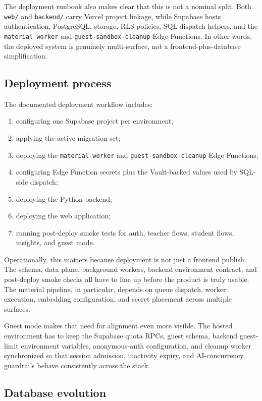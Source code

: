 \documentclass[11pt,a4paper]{article}
\begin{document}
The deployment runbook also makes clear that this is not a nominal split. Both \texttt{web/} and
\texttt{backend/} carry Vercel project linkage, while Supabase hosts authentication, PostgreSQL,
storage, RLS policies, SQL dispatch helpers, and the \texttt{material-worker} and
\texttt{guest-sandbox-cleanup} Edge Functions. In other words, the deployed system is genuinely
multi-surface, not a frontend-plus-database simplification.

\subsection{Deployment process}

The documented deployment workflow includes:
\begin{enumerate}
  \item configuring one Supabase project per environment;
  \item applying the active migration set;
  \item deploying the \texttt{material-worker} and \texttt{guest-sandbox-cleanup} Edge Functions;
  \item configuring Edge Function secrets plus the Vault-backed values used by SQL-side dispatch;
  \item deploying the Python backend;
  \item deploying the web application;
  \item running post-deploy smoke tests for auth, teacher flows, student flows, insights, and guest mode.
\end{enumerate}

Operationally, this matters because deployment is not just a frontend publish. The schema, data
plane, background workers, backend environment contract, and post-deploy smoke checks all have to
line up before the product is truly usable. The material pipeline, in particular, depends on queue
dispatch, worker execution, embedding configuration, and secret placement across multiple surfaces.

Guest mode makes that need for alignment even more visible. The hosted environment has to keep the
Supabase quota RPCs, guest schema, backend guest-limit environment variables, anonymous-auth
configuration, and cleanup worker synchronized so that session admission, inactivity expiry, and
AI-concurrency guardrails behave consistently across the stack.

\subsection{Database evolution}
\end{document}
